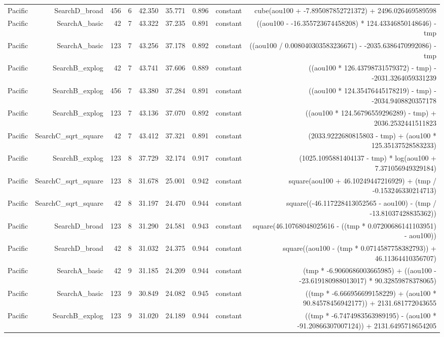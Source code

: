 \begin{table}
{\begin{tabular}{lrrrrrrrr}
Pacific & SearchD\_broad & 456 & 6 & 42.350 & 35.771 & 0.896 & constant & cube(aou100 + -7.895087852721372) + 2496.026469589598 \\
Pacific & SearchA\_basic & 42 & 7 & 43.322 & 37.235 & 0.891 & constant & ((aou100 - -16.355723674458208) * 124.43346850148646) - tmp \\
Pacific & SearchA\_basic & 123 & 7 & 43.256 & 37.178 & 0.892 & constant & ((aou100 / 0.008040303583236671) - -2035.6386470992086) - tmp \\
Pacific & SearchB\_explog & 42 & 7 & 43.741 & 37.606 & 0.889 & constant & ((aou100 * 126.43798731579372) - tmp) - -2031.3264059331239 \\
Pacific & SearchB\_explog & 456 & 7 & 43.380 & 37.284 & 0.891 & constant & ((aou100 * 124.35476445178219) - tmp) - -2034.9408820357178 \\
Pacific & SearchB\_explog & 123 & 7 & 43.136 & 37.070 & 0.892 & constant & ((aou100 * 124.56796559296289) - tmp) + 2036.2532441511823 \\
Pacific & SearchC\_sqrt\_square & 42 & 7 & 43.412 & 37.321 & 0.891 & constant & (2033.9222680815803 - tmp) + (aou100 * 125.35137528583233) \\
Pacific & SearchB\_explog & 123 & 8 & 37.729 & 32.174 & 0.917 & constant & (1025.1095881404137 - tmp) * log(aou100 + 7.371056949329184) \\
Pacific & SearchC\_sqrt\_square & 123 & 8 & 31.678 & 25.001 & 0.942 & constant & square(aou100 + 46.10249447216929) + (tmp / -0.153246330214713) \\
Pacific & SearchC\_sqrt\_square & 42 & 8 & 31.197 & 24.470 & 0.944 & constant & square((-46.117228413052565 - aou100) - (tmp / -13.81037428835362)) \\
Pacific & SearchD\_broad & 123 & 8 & 31.290 & 24.581 & 0.943 & constant & square(46.10768048025616 - ((tmp * 0.07200686141103951) - aou100)) \\
Pacific & SearchD\_broad & 42 & 8 & 31.032 & 24.375 & 0.944 & constant & square((aou100 - (tmp * 0.0714587758382793)) + 46.11364410356707) \\
Pacific & SearchA\_basic & 42 & 9 & 31.185 & 24.209 & 0.944 & constant & (tmp * -6.9060686003665985) + ((aou100 - -23.619180988013017) * 90.32859878378065) \\
Pacific & SearchA\_basic & 123 & 9 & 30.849 & 24.082 & 0.945 & constant & ((tmp * -6.666956699158229) + (aou100 * 90.84578456942177)) + 2131.681772043655 \\
Pacific & SearchB\_explog & 123 & 9 & 31.020 & 24.189 & 0.944 & constant & ((tmp * -6.7474983563989195) - (aou100 * -91.20866307007124)) + 2131.6495718654205 \\

\end{tabular}}
\end{table}
